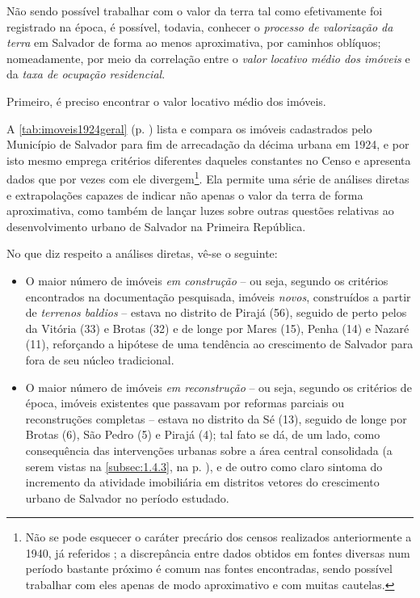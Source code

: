 Não sendo possível trabalhar com o valor da terra tal como efetivamente foi registrado na época, é possível, todavia, conhecer o \textit{processo de valorização da terra} em Salvador de forma ao menos aproximativa, por caminhos oblíquos; nomeadamente, por meio da correlação entre o \textit{valor locativo médio dos imóveis} e da \textit{taxa de ocupação residencial}.

Primeiro, é preciso encontrar o valor locativo médio dos imóveis. 

A \autoref{tab:imoveis1924geral} (p. \pageref{tab:imoveis1924geral}) lista e compara os imóveis cadastrados pelo Município de Salvador para fim de arrecadação da décima urbana em 1924, e por isto mesmo emprega critérios diferentes daqueles constantes no Censo e apresenta dados que por vezes com ele divergem\footnote{Não se pode esquecer o caráter precário dos censos realizados anteriormente a 1940, já referidos \cite{oliveirasimoes_censos_2005, reisetal_areascensos_2011}; a discrepância entre dados obtidos em fontes diversas num período bastante próximo é comum nas fontes encontradas, sendo possível trabalhar com eles apenas de modo aproximativo e com muitas cautelas.}. Ela permite uma série de análises diretas e extrapolações capazes de indicar não apenas o valor da terra de forma aproximativa, como também de lançar luzes sobre outras questões relativas ao desenvolvimento urbano de Salvador na Primeira República.



No que diz respeito a análises diretas, vê-se o seguinte:

\begin{itemize}
\item O maior número de imóveis \textit{em construção} -- ou seja, segundo os critérios encontrados na documentação pesquisada, imóveis \textit{novos}, construídos a partir de \textit{terrenos baldios} -- estava no distrito de Pirajá (56), seguido de perto pelos da Vitória (33) e Brotas (32) e de longe por Mares (15), Penha (14) e Nazaré (11), reforçando a hipótese de uma tendência ao crescimento de Salvador para fora de seu núcleo tradicional.
\item O maior número de imóveis \textit{em reconstrução} -- ou seja, segundo os critérios de época, imóveis existentes que passavam por reformas parciais ou reconstruções completas -- estava no distrito da Sé (13), seguido de longe por Brotas (6), São Pedro (5) e Pirajá (4); tal fato se dá, de um lado, como consequência das intervenções urbanas sobre a área central consolidada (a serem vistas na \autoref{subsec:1.4.3}, na p. \pageref{subsec:1.4.3}), e de outro como claro sintoma do incremento da atividade imobiliária em distritos vetores do crescimento urbano de Salvador no período estudado.
\end{itemize}


